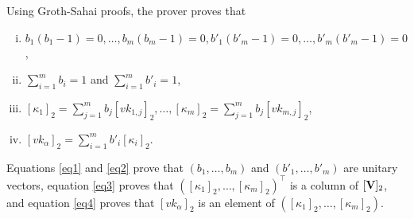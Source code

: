 Using Groth-Sahai proofs, the prover proves that
\begin{enumerate}[i.]
\item $b_1(b_1-1)=0,\ldots,b_m(b_m-1)=0,b'_1(b'_m-1)=0,\ldots,b'_m(b'_m-1)=0$,\label{eq1}
\item $\sum_{i=1}^m b_i =1$ and $\sum_{i=1}^m b'_i=1$,\label{eq2}
\item $[\kappa_1]_2=\sum_{j=1}^m b_j [vk_{1,j}]_2,\ldots,[\kappa_m]_2=\sum_{j=1}^m b_j[vk_{m,j}]_2$,\label{eq3}
\item $[vk_\alpha]_2=\sum_{i=1}^m b'_i[\kappa_i]_2$.\label{eq4}
\end{enumerate}
Equations \ref{eq1} and \ref{eq2} prove that $(b_1,\ldots,b_m)$ and $(b'_1,\ldots,b'_m)$ are unitary vectors, equation \ref{eq3} proves that $([\kappa_1]_2,\ldots,[\kappa_m]_2)^\top$ is a column of $[\mathbf{{V}}]_2$, and equation \ref{eq4} proves that $[vk_\alpha]_2$ is an element of $([\kappa_1]_2,\ldots,[\kappa_m]_2)$.